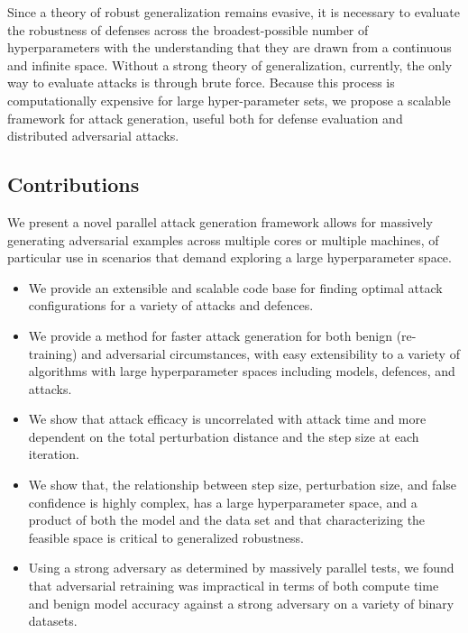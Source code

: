 \documentclass[fonts]{icst}
\begin{document}
Since a theory of robust generalization remains evasive, it is necessary to evaluate the robustness of defenses across the broadest-possible number of hyperparameters with the understanding that they are drawn from a continuous and infinite space.
Without a strong theory of generalization, currently, the only way to evaluate attacks is through brute force.
Because this process is computationally expensive for large hyper-parameter sets, we propose a scalable framework for attack generation, useful both for defense evaluation and distributed adversarial attacks.


\subsection{Contributions}


We present a novel parallel attack generation framework allows for massively generating adversarial examples across multiple cores or multiple machines, of particular use in scenarios that demand exploring a large hyperparameter space.

\begin{itemize}

    \item We provide an extensible and scalable code base for finding optimal attack configurations for a variety of attacks and defences.

    \item  We provide a method for faster attack generation for both benign (re-training) and adversarial circumstances, with easy extensibility to a variety of algorithms with large hyperparameter spaces including  models, defences, and attacks.

    \item We show that attack efficacy is uncorrelated with attack time and more dependent on the total perturbation distance and the step size at each iteration.

    \item We show that, the relationship between step size, perturbation size, and false confidence is highly complex, has a large hyperparameter space, and a product of both the model and the data set and that characterizing the feasible space is critical to generalized robustness.

    \item Using a strong adversary as determined by massively parallel tests, we found that adversarial retraining was impractical in terms of both compute time and benign model accuracy against a strong adversary on a variety of binary datasets.

\end{itemize}
\end{document}
